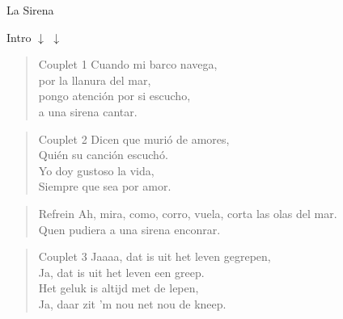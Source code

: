 \begin{song}[vals]{La Sirena}

\begin{instrumental}{Intro}
 \measure{}\measure{} 
  \measure{}\measure{} 
 \measure{}\measure{} 
     $\downarrow$ $\downarrow$
\end{instrumental}

\begin{verse}{Couplet 1}
Cuando mi barco navega,\\ 
por la llanura del mar,\\ 
\chord{}pongo atención por si escucho,\\ 
a una sirena cantar.\\ 
\end{verse}

\begin{verse}{Couplet 2}
Dicen que murió de amores,\\ 
Quién su canción escuchó. \\
\chord{}Yo doy gustoso la vida, \\
Siempre que sea por amor. \\
\end{verse}

\begin{verse}{Refrein}
Ah, mira, como,  corro, vuela, corta las olas del mar.\\
Quen pudiera a una sirena enconrar.
\end{verse}

\begin{verse}{Couplet 3}
Jaaaa, dat is uit het leven gegrepen,\\
Ja, dat is uit het leven een greep.\hspace{1.5em}\\
Het geluk is altijd met de lepen,\\
Ja, daar zit 'm nou net nou de kneep.\hspace{1.5em}
\end{verse}


\end{song}

